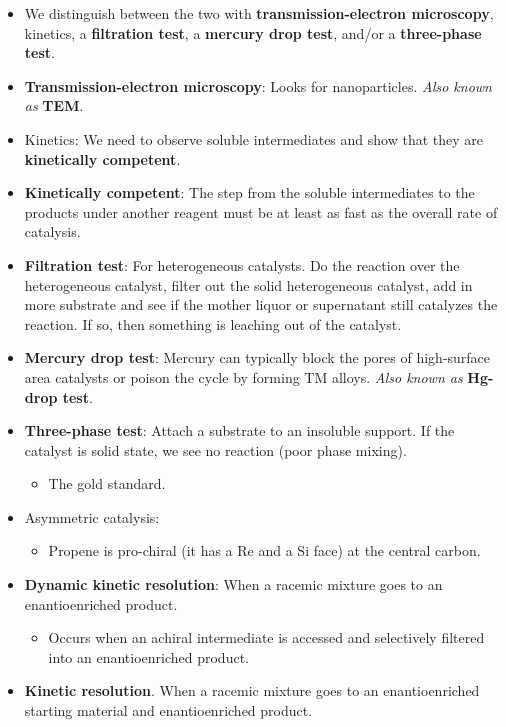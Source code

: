 \documentclass[../notes.tex]{subfiles}
\begin{document}
\begin{itemize}
    \item We distinguish between the two with \textbf{transmission-electron microscopy}, kinetics, a \textbf{filtration test}, a \textbf{mercury drop test}, and/or a \textbf{three-phase test}.
    \item \textbf{Transmission-electron microscopy}: Looks for nanoparticles. \emph{Also known as} \textbf{TEM}.
    \item Kinetics: We need to observe soluble intermediates and show that they are \textbf{kinetically competent}.
    \item \textbf{Kinetically competent}: The step from the soluble intermediates to the products under another reagent must be at least as fast as the overall rate of catalysis.
    \item \textbf{Filtration test}: For heterogeneous catalysts. Do the reaction over the heterogeneous catalyst, filter out the solid heterogeneous catalyst, add in more substrate and see if the mother liquor or supernatant still catalyzes the reaction. If so, then something is leaching out of the catalyst.
    \item \textbf{Mercury drop test}: Mercury can typically block the pores of high-surface area catalysts or poison the cycle by forming TM alloys. \emph{Also known as} \textbf{Hg-drop test}.
    \item \textbf{Three-phase test}: Attach a substrate to an insoluble support. If the catalyst is solid state, we see no reaction (poor phase mixing).
    \begin{itemize}
        \item The gold standard.
    \end{itemize}
    \item Asymmetric catalysis:
    \begin{itemize}
        \item Propene is pro-chiral (it has a Re and a Si face) at the central carbon.
    \end{itemize}
    \item \textbf{Dynamic kinetic resolution}: When a racemic mixture goes to an enantioenriched product.
    \begin{itemize}
        \item Occurs when an achiral intermediate is accessed and selectively filtered into an enantioenriched product.
    \end{itemize}
    \item \textbf{Kinetic resolution}. When a racemic mixture goes to an enantioenriched starting material and enantioenriched product.

\end{itemize}
\end{document}
